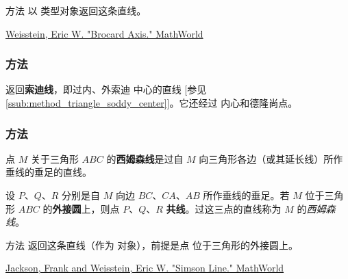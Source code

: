 方法  以  类型对象返回这条直线。
\begin{flushright}
\small
\href{[URL1]}{Weisstein, Eric W. "Brocard Axis." MathWorld}
\end{flushright}

\vspace{1em}

\subsubsection{方法 }
\label{ssub:method_triangle_soddy_line}

返回\textbf{索迪线}，即过内、外索迪
中心的直线 [参见 \ref{ssub:method_triangle_soddy_center}]。它还经过
内心和德隆尚点。

\begin{tkzexample}
\end{tkzexample}

\subsubsection{方法 } %
\label{ssub:method_triangle_simson__line}

点 $M$ 关于三角形 $ABC$ 的\textbf{西姆森线}是过自 $M$ 向三角形各边（或其延长线）所作垂线的垂足的直线。

\medskip

设 $P$、$Q$、$R$ 分别是自 $M$ 向边 $BC$、$CA$、$AB$ 所作垂线的垂足。若 $M$ 位于三角形 $ABC$ 的\textbf{外接圆}上，则点 $P$、$Q$、$R$ \textbf{共线}。过这三点的直线称为 $M$ 的\emph{西姆森线}。

\medskip

方法  返回这条直线（作为  对象），前提是点  位于三角形的外接圆上。
\begin{flushright}
\small
\href{[URL1]}{Jackson, Frank and Weisstein, Eric W. "Simson Line." MathWorld}
\end{flushright}

